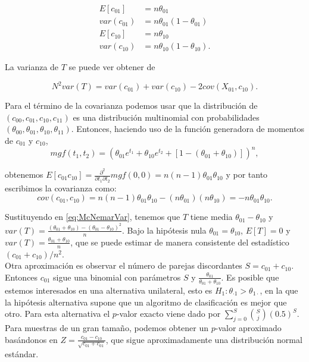 \begin{align*}
	E[c_{01}] 	&= n \theta_{01} \\
	var(c_{01}) &= n \theta_{01} (1 - \theta_{01}) \\
	E[c_{10}] 	&= n \theta_{10} \\
	var(c_{10}) &= n \theta_{10} (1 - \theta_{10}).
\end{align*}

	La varianza de $T$ se puede ver obtener de 
	
\begin{equation}
	N^2 var(T) = var(c_{01}) + var(c_{10}) - 2 cov(X_{01}, c_{10}).
	\label{eq:McNemarVar}
\end{equation}

	Para el término de la covarianza podemos usar que la distribución de $(c_{00}, c_{01}, c_{10}, c_{11})$ es una distribución multinomial con probabilidades $(\theta_{00}, \theta_{01}, \theta_{10}, \theta_{11})$. Entonces, haciendo uso de la función generadora de momentos de $c_{01}$ y $c_{10}$,
	\[ 
		mgf(t_1, t_2) = 
		\left(
			\theta_{01} e^{t_1} + 
			\theta_{10} e^{t_2} + 
			[ 1 - (\theta_{01} + \theta_{10})] \right)^n,
	\]
	
	obtenemos $E[c_{01}c_{10}] = \frac{\partial^2 }{\partial t_1 \partial t_2} mgf(0,0) = n(n-1)\theta_{01} \theta_{10}$ y por tanto escribimos la covarianza como:
	\[
		cov( c_{01}, c_{10} ) =
			n (n-1) \theta_{01} \theta_{10} -
			(n \theta_{01}) (n \theta_{10}) = - n \theta_{01} \theta_{10}.
	\]
	
	Sustituyendo en \ref{eq:McNemarVar}, tenemos que $T$ tiene media $\theta_{01}-\theta_{10}$ y $var(T) = \frac{(\theta_{01} + \theta_{10}) - (\theta_{01} - \theta_{10})^2 }{n}$. Bajo la hipótesis nula $\theta_{01} = \theta_{10}$, $E[T] = 0$ y $var(T) = \frac{\theta_{01}+\theta_{10}}{n}$, que se puede estimar de manera consistente del estadístico $(c_{01} + c_{10})/n^2$.\\
	Otra aproximación es observar el número de parejas discordantes $S = c_{01} + c_{10}$. Entonces $c_{01}$ sigue una binomial con parámetros $S$ y $\frac{\theta_{01}}{\theta_{01}+\theta_{10}}$. Es posible que estemos interesados en una alternativa unilateral, esto es $H_1: \theta_{\cdot 1} > \theta_{1 \cdot}$, en la que la hipótesis alternativa supone que un algoritmo de clasificación es mejor que otro. Para esta alternativa el $p$-valor exacto viene dado por $\sum\limits_{j=0}^S {S \choose j}(0.5)^S$. Para muestras de un gran tamaño, podemos obtener un $p$-valor aproximado basándonos en $Z = \frac{c_{01} - c_{10}}{\sqrt{c_{01} + c_{01}}}$, que sigue aproximadamente una distribución normal estándar.
	
